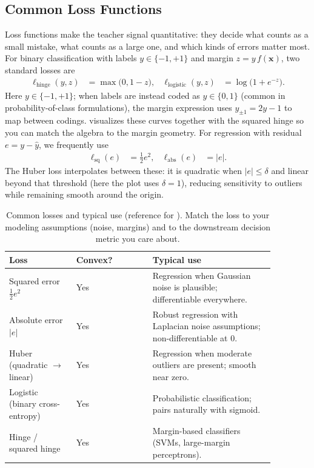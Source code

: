 \subsection{Common Loss Functions}
\label{sec:supervised_common_loss_functions}

Loss functions make the teacher signal quantitative: they decide what counts as a small mistake, what counts as a large one, and which kinds of errors matter most.
For binary classification with labels \(y \in \{-1, +1\}\) and margin \(z = y\, f(\mathbf{x})\), two standard losses are
\begin{align*}
\ell_{\text{hinge}}(y, z) &= \max\bigl(0, 1 - z\bigr), &
\ell_{\text{logistic}}(y, z) &= \log\bigl(1 + e^{-z}\bigr).
\end{align*}
Here \(y\in\{-1,+1\}\); when labels are instead coded as \(y\in\{0,1\}\) (common in probability-of-class formulations), the margin expression uses \(y_{\pm1}=2y-1\) to map between codings.
 visualizes these curves together with the squared hinge so you can match the algebra to the margin geometry.
For regression with residual \(e = y - \hat{y}\), we frequently use
\begin{align*}
    \ell_{\text{sq}}(e) &= \tfrac{1}{2} e^2, &
    \ell_{\text{abs}}(e) &= |e|.
\end{align*}
The Huber loss interpolates between these: it is quadratic when \(|e| \le \delta\) and linear beyond that threshold (here the plot uses \(\delta=1\)), reducing sensitivity to outliers while remaining smooth around the origin.

\begin{table}[!htbp]
\centering
\caption{Common losses and typical use (reference for ). Match the loss to your modeling assumptions (noise, margins) and to the downstream decision metric you care about.}
\begin{tabular}{@{}>{\raggedright\arraybackslash}p{0.22\linewidth} >{\raggedright\arraybackslash}p{0.25\linewidth} >{\raggedright\arraybackslash}p{0.4\linewidth}@{}}
\toprule
\textbf{Loss} & \textbf{Convex?} & \textbf{Typical use} \\
\midrule
Squared error $\tfrac{1}{2}e^2$ & Yes & Regression when Gaussian noise is plausible; differentiable everywhere. \\
Absolute error $|e|$ & Yes & Robust regression with Laplacian noise assumptions; non-differentiable at 0. \\
Huber (quadratic $\rightarrow$ linear) & Yes & Regression when moderate outliers are present; smooth near zero. \\
Logistic (binary cross\hyp{}entropy) & Yes & Probabilistic classification; pairs naturally with sigmoid. \\
Hinge / squared hinge & Yes & Margin-based classifiers (SVMs, large-margin perceptrons). \\
\bottomrule
\end{tabular}
\end{table}

